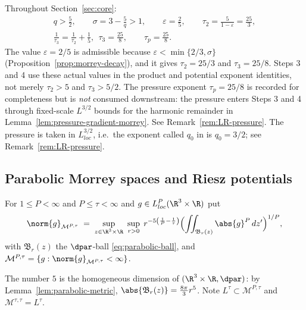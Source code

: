 \documentclass[11pt,reqno]{amsart}
\begin{document}
\begin{convention}\label{conv:step-params}
Throughout Section~\ref{sec:core}:
\begin{equation}\label{eq:standing}\begin{gathered}
  q>\tfrac52,\qquad \sigma=3-\tfrac5q>1,\qquad
  \varepsilon=\tfrac25,\qquad
  \tau_{2}=\frac{5}{1-\varepsilon}=\frac{25}{3},\\
  \frac1{\tau_{3}}=\frac1{\tau_{2}}+\frac15,\ \ \tau_{3}=\frac{25}{8},
  \qquad \tau_{p}=\frac{25}{8}.
\end{gathered}\end{equation}
The value $\varepsilon=2/5$ is admissible because
$\varepsilon<\min\{2/3,\sigma\}$ (Proposition~\ref{prop:morrey-decay}), and it
gives $\tau_{2}=25/3$ and $\tau_{3}=25/8$.
Steps 3 and 4 use these actual values in the product and potential
exponent identities, not merely $\tau_2>5$ and $\tau_3>5/2$. The pressure exponent $\tau_{p}=25/8$ is recorded for
completeness but is \emph{not} consumed downstream: the pressure enters Steps 3
and 4 through fixed-scale $L^{3/2}$ bounds for the harmonic remainder
in Lemma~\ref{lem:pressure-gradient-morrey}. See
Remark~\ref{rem:LR-pressure}. The pressure is taken in
$L^{3/2}_{loc}$, i.e.\ the exponent called $q_{0}$ in
\cite{LemarieRieusset2016} is $q_{0}=3/2$; see Remark~\ref{rem:LR-pressure}.
\end{convention}

\subsection{Parabolic Morrey spaces and Riesz potentials}\label{ss:morrey}

\begin{definition}\label{def:parabolic-morrey}
For $1\le P<\infty$ and $P\le\tau<\infty$ and $g\in L^{P}_{loc}(\R^{3}\times\R)$
put
\begin{equation}\label{eq:morrey-norm}
  \norm{g}_{\mathcal{M}^{P,\tau}}
  \;=\;\sup_{z\in\R^{3}\times\R}\ \sup_{r>0}\;
    r^{-5\left(\frac1P-\frac1\tau\right)}
    \Bigl(\iint_{\mathfrak{B}_{r}(z)}\abs{g}^{P}\,dz'\Bigr)^{1/P},
\end{equation}
with $\mathfrak{B}_{r}(z)$ the $\dpar$-ball \eqref{eq:parabolic-ball}, and
$\mathcal{M}^{P,\tau}=\{g:\norm{g}_{\mathcal{M}^{P,\tau}}<\infty\}$.
\end{definition}

The number $5$ is the homogeneous dimension of $(\R^{3}\times\R,\dpar)$: by
Lemma~\ref{lem:parabolic-metric},
$\abs{\mathfrak{B}_{r}(z)}=\tfrac{8\pi}{3}r^{5}$. Note
$L^{\tau}\subset\mathcal{M}^{P,\tau}$ and
$\mathcal{M}^{\tau,\tau}=L^{\tau}$.
\end{document}

